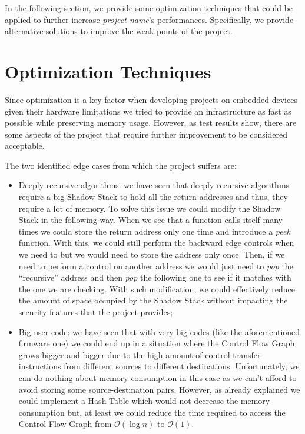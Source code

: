 In the following section, we provide some optimization techniques that could be
applied to further increase \textit{project name}'s performances. Specifically, we
provide alternative solutions to improve the weak points of the project.

\section{Optimization Techniques}
\label{sec:pa_optimization}

Since optimization is a key factor when developing projects on embedded devices
given their hardware limitations we tried to provide an infrastructure as fast
as possible while preserving memory usage. However, as test results show, there are
some aspects of the project that require further improvement to be considered acceptable.

The two identified edge cases from which the project suffers are:
\begin{itemize}
  \item Deeply recursive algorithms: we have seen that deeply recursive
    algorithms require a big Shadow Stack to hold all the return addresses and
    thus, they require a lot of memory. To solve this issue we could modify the
    Shadow Stack in the following way. When we see that a function calls itself many
    times we could store the return address only one time and introduce a \textit{peek}
    function. With this, we could still perform the backward edge controls when
    we need to but we would need to store the address only once. Then, if we
    need to perform a control on another address we would just need to \textit{pop}
    the ``recursive'' address and then \textit{pop} the following one to see if
    it matches with the one we are checking. With such modification, we could
    effectively reduce the amount of space occupied by the Shadow Stack without
    impacting the security features that the project provides;

  \item Big user code: we have seen that with very big codes (like the aforementioned
    firmware one) we could end up in a situation where the Control Flow Graph
    grows bigger and bigger due to the high amount of control transfer
    instructions from different sources to different destinations. Unfortunately,
    we can do nothing about memory consumption in this case as we can't afford
    to avoid storing some source-destination pairs. However, as already
    explained we could implement a Hash Table which would not decrease the
    memory consumption but, at least we could reduce the time required to access
    the Control Flow Graph from $\mathcal{O}(\log{n})$ to $\mathcal{O}(1)$.
\end{itemize}

